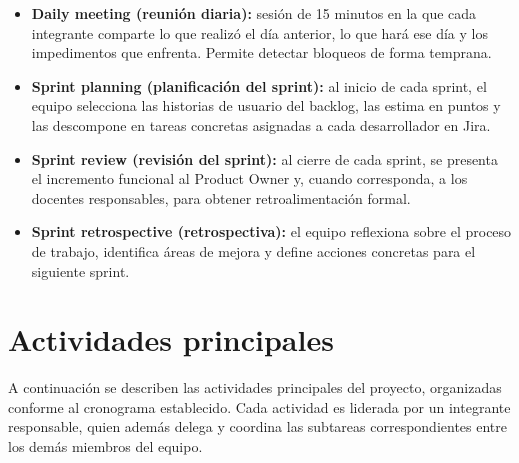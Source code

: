 \begin{itemize}
    \item \textbf{Daily meeting (reunión diaria):} sesión de 15 minutos en la que cada
            integrante comparte lo que realizó el día anterior, lo que hará ese día y los
            impedimentos que enfrenta. Permite detectar bloqueos de forma temprana.
    \item \textbf{Sprint planning (planificación del sprint):} al inicio de cada sprint, el
            equipo selecciona las historias de usuario del backlog, las estima en puntos y las
            descompone en tareas concretas asignadas a cada desarrollador en Jira.
    \item \textbf{Sprint review (revisión del sprint):} al cierre de cada sprint, se
            presenta el incremento funcional al Product Owner y, cuando corresponda, a los
            docentes responsables, para obtener retroalimentación formal.
    \item \textbf{Sprint retrospective (retrospectiva):} el equipo reflexiona sobre el proceso
            de trabajo, identifica áreas de mejora y define acciones concretas para el
            siguiente sprint.
\end{itemize}

\section{Actividades principales}

A continuación se describen las actividades principales del proyecto, organizadas conforme
al cronograma establecido. Cada actividad es liderada por un integrante responsable, quien
además delega y coordina las subtareas correspondientes entre los demás miembros del equipo.

